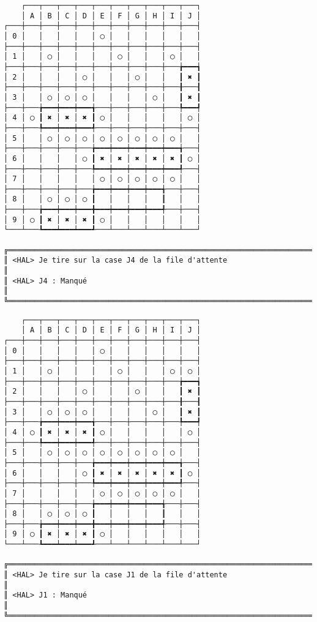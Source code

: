 {\scriptsize
\begin{verbatim}
    ┌───┬───┬───┬───┬───┬───┬───┬───┬───┬───┐
    │ A │ B │ C │ D │ E │ F │ G │ H │ I │ J │
┌───┼───┼───┼───┼───┼───┼───┼───┼───┼───┼───┤
│ 0 │   │   │   │   │ ◯ │   │   │   │   │   │
├───┼───┼───┼───┼───┼───┼───┼───┼───┼───┼───┤
│ 1 │   │ ◯ │   │   │   │ ◯ │   │   │ ◯ │   │
├───┼───┼───┼───┼───┼───┼───┼───┼───┼───╆━━━┪
│ 2 │   │   │   │ ◯ │   │   │ ◯ │   │   ┃ ✖ ┃
├───┼───┼───┼───┼───┼───┼───┼───┼───┼───╂───┨
│ 3 │   │ ◯ │ ◯ │ ◯ │   │   │   │ ◯ │   ┃ ✖ ┃
├───┼───╆━━━┿━━━┿━━━╅───┼───┼───┼───┼───╄━━━┩
│ 4 │ ◯ ┃ ✖ │ ✖ │ ✖ ┃ ◯ │   │   │   │   │ ◯ │
├───┼───╄━━━┿━━━┿━━━╃───┼───┼───┼───┼───┼───┤
│ 5 │   │ ◯ │ ◯ │ ◯ │ ◯ │ ◯ │ ◯ │ ◯ │ ◯ │   │
├───┼───┼───┼───┼───╆━━━┿━━━┿━━━┿━━━┿━━━╅───┤
│ 6 │   │   │   │ ◯ ┃ ✖ │ ✖ │ ✖ │ ✖ │ ✖ ┃ ◯ │
├───┼───┼───┼───┼───╄━━━┿━━━┿━━━┿━━━┿━━━╃───┤
│ 7 │   │   │   │   │ ◯ │ ◯ │ ◯ │ ◯ │ ◯ │   │
├───┼───┼───┼───┼───╆━━━┿━━━┿━━━┿━━━╅───┼───┤
│ 8 │   │ ◯ │ ◯ │ ◯ ┃   │   │   │   ┃   │   │
├───┼───╆━━━┿━━━┿━━━╋━━━┿━━━┿━━━┿━━━╃───┼───┤
│ 9 │ ◯ ┃ ✖ │ ✖ │ ✖ ┃ ◯ │   │   │   │   │   │
└───┴───┺━━━┷━━━┷━━━┹───┴───┴───┴───┴───┴───┘

╔══════════════════════════════════════════════════════════════════════════════════════════════════╗
║ <HAL> Je tire sur la case J4 de la file d'attente                                                ║
║ <HAL> J4 : Manqué                                                                                ║
╚══════════════════════════════════════════════════════════════════════════════════════════════════╝
\end{verbatim}}
\newpage

{\scriptsize
\begin{verbatim}
    ┌───┬───┬───┬───┬───┬───┬───┬───┬───┬───┐
    │ A │ B │ C │ D │ E │ F │ G │ H │ I │ J │
┌───┼───┼───┼───┼───┼───┼───┼───┼───┼───┼───┤
│ 0 │   │   │   │   │ ◯ │   │   │   │   │   │
├───┼───┼───┼───┼───┼───┼───┼───┼───┼───┼───┤
│ 1 │   │ ◯ │   │   │   │ ◯ │   │   │ ◯ │ ◯ │
├───┼───┼───┼───┼───┼───┼───┼───┼───┼───╆━━━┪
│ 2 │   │   │   │ ◯ │   │   │ ◯ │   │   ┃ ✖ ┃
├───┼───┼───┼───┼───┼───┼───┼───┼───┼───╂───┨
│ 3 │   │ ◯ │ ◯ │ ◯ │   │   │   │ ◯ │   ┃ ✖ ┃
├───┼───╆━━━┿━━━┿━━━╅───┼───┼───┼───┼───╄━━━┩
│ 4 │ ◯ ┃ ✖ │ ✖ │ ✖ ┃ ◯ │   │   │   │   │ ◯ │
├───┼───╄━━━┿━━━┿━━━╃───┼───┼───┼───┼───┼───┤
│ 5 │   │ ◯ │ ◯ │ ◯ │ ◯ │ ◯ │ ◯ │ ◯ │ ◯ │   │
├───┼───┼───┼───┼───╆━━━┿━━━┿━━━┿━━━┿━━━╅───┤
│ 6 │   │   │   │ ◯ ┃ ✖ │ ✖ │ ✖ │ ✖ │ ✖ ┃ ◯ │
├───┼───┼───┼───┼───╄━━━┿━━━┿━━━┿━━━┿━━━╃───┤
│ 7 │   │   │   │   │ ◯ │ ◯ │ ◯ │ ◯ │ ◯ │   │
├───┼───┼───┼───┼───╆━━━┿━━━┿━━━┿━━━╅───┼───┤
│ 8 │   │ ◯ │ ◯ │ ◯ ┃   │   │   │   ┃   │   │
├───┼───╆━━━┿━━━┿━━━╋━━━┿━━━┿━━━┿━━━╃───┼───┤
│ 9 │ ◯ ┃ ✖ │ ✖ │ ✖ ┃ ◯ │   │   │   │   │   │
└───┴───┺━━━┷━━━┷━━━┹───┴───┴───┴───┴───┴───┘

╔══════════════════════════════════════════════════════════════════════════════════════════════════╗
║ <HAL> Je tire sur la case J1 de la file d'attente                                                ║
║ <HAL> J1 : Manqué                                                                                ║
╚══════════════════════════════════════════════════════════════════════════════════════════════════╝
\end{verbatim}}
\newpage

